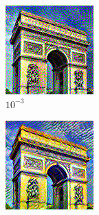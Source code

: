 \documentclass[12pt]{beamer}
\begin{document}
\begin{frame}
\begin{figure}[ht]
\begin{subfigure}[b]{0.25\textwidth}
                \includegraphics[width=\textwidth]{resources/gatys/weights/sun-trees-paris-10-3.png}
                \caption{$10^{-3}$}
            \end{subfigure}
            \hfill
            \begin{subfigure}[b]{0.25\textwidth}
                \centering
                \includegraphics[width=\textwidth]{resources/gatys/weights/sun-trees-paris-10-4.png}

\end{subfigure}
\end{figure}
\end{frame}
\end{document}
